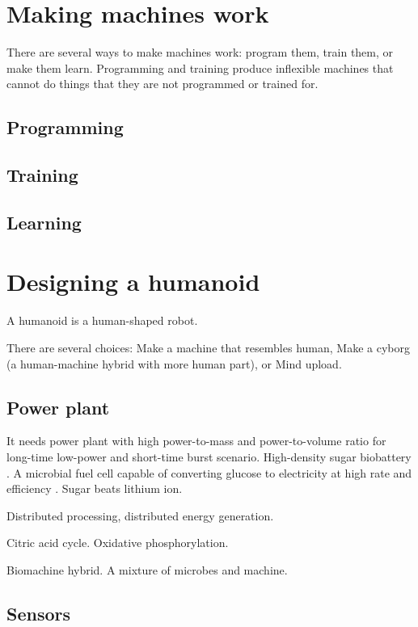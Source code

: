 \chapter{Making machines work}

There are several ways to make machines work:
program them, train them, or make them learn.
Programming and training produce inflexible machines
that cannot do things that they are not programmed or trained for.

\section{Programming}

\section{Training}

\section{Learning}

\chapter{Designing a humanoid}

A humanoid is a human-shaped robot.

There are several choices:
Make a machine that resembles human,
Make a cyborg (a human-machine hybrid with more human part),
or Mind upload.

\section{Power plant}

It needs power plant with high power-to-mass and power-to-volume ratio
for long-time low-power and short-time burst scenario.
High-density sugar biobattery \cite{zhu2014high}.
A microbial fuel cell capable of converting glucose to
electricity at high rate and efficiency \cite{rabaey2003microbial}.
Sugar beats lithium ion.

Distributed processing, distributed energy generation.

Citric acid cycle.
Oxidative phosphorylation.

Biomachine hybrid.
A mixture of microbes and machine.

\section{Sensors}

